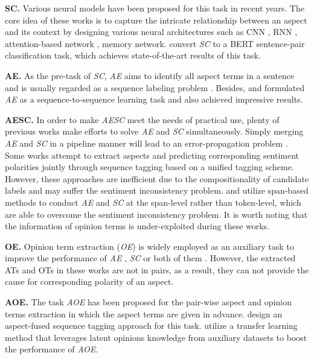 \documentclass[letterpaper]{article} \usepackage{aaai21}  \usepackage{times}  \usepackage{helvet} \usepackage{courier}  \usepackage[hyphens]{url}  \usepackage{graphicx} \urlstyle{rm} \def\UrlFont{\rm}  \usepackage{natbib}  \usepackage{caption}
\begin{document}
\textbf{SC.} Various neural models have been proposed for this task in recent years. 
The core idea of these works is to capture the intricate relationship between an aspect and its context by designing various neural architectures such as 
CNN \cite{HuangC18,LamLSB18}, RNN \cite{tang-etal-2016-effective,ZhangZV16,RuderGB16}, attention-based network \cite{MaLZW17, DuSWQLXL19, WangHZZ16,GuZHS18,YangTWXC17}, memory network\cite{TangQL16,ChenSBY17,FanGD0XW18}.
\citet{SunHQ19}  convert \emph{SC} to a BERT sentence-pair classification task, which achieves state-of-the-art results of this task. 
    
\textbf{AE.} As the pre-task of \emph{SC}, \emph{AE} aims to identify all aspect terms in a sentence  \cite{kddHuL04,pontiki-etal-2014-semeval} and is usually regarded as a sequence labeling problem  \cite{LiBLLY18,XuLSY18,HeLND17}. 
Besides, \cite{MaLWXW19} and \cite{LiCQLS20} formulated \emph{AE} as a sequence-to-sequence learning task and also achieved impressive results. 	

\textbf{AESC.} In order to make \emph{AESC} meet the needs of practical use, plenty of previous works make efforts to solve \emph{AE} and \emph{SC} simultaneously. 
Simply merging \emph{AE} and \emph{SC} in a pipeline manner will lead to an error-propagation problem \cite{MaLW18}. 
Some works \cite{li2019unified,LiBZL19} attempt to extract aspects and predicting corresponding sentiment polarities jointly through sequence tagging based on a unified tagging scheme. However, 
these approaches are inefficient due to the compositionality of candidate labels \cite{LeeKP016} and may suffer the sentiment inconsistency problem. 
\citet{ZhouHGHH19} and  \citet{hu-etal-2019-open} utilize span-based methods to conduct \emph{AE} and \emph{SC} at the span-level rather than token-level, which are able to overcome the sentiment inconsistency problem. 
It is worth noting that the information of opinion terms is under-exploited during these works. 

\textbf{OE.} Opinion term extraction (\emph{OE}) is widely employed as an auxiliary task to improve the performance of \emph{AE} \cite{YuJX19,DBLP:conf/aaai/WangPDX17,PanW18}, \emph{SC} \cite{he-etal-2019-interactive} or both of them \cite{chen-qian-2020-relation}. 
However, the extracted ATs and OTs in these works are not in pairs, as a result, they can not provide  the cause for corresponding polarity of an aspect. 	

\textbf{AOE.} The task \emph{AOE} \cite{fan2019target} has been proposed for the pair-wise aspect and opinion terms extraction in which the aspect terms are given in advance. \citet{fan2019target} design an aspect-fused sequence tagging approach for this task.   
\citet{DBLP:conf/aaai/WuZDHC20} utilize a transfer learning method that leverages latent opinions knowledge from auxiliary datasets to boost the performance of \emph{AOE}. 
\end{document}
